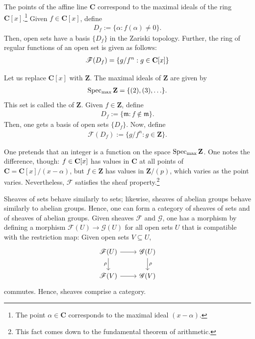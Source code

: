 \documentclass [11 pt, oneside, margin = 1 in] {article}
\begin{document}
\begin{example}[ ]\label{}\text{}
The points of the affine line $\mathbf{C}$ correspond to the maximal ideals of the ring $\mathbf{C}[x]$.\footnote{The point $\alpha\in \mathbf{C}$ corresponds to the maximal ideal $(x-\alpha)$.} Given $f\in \mathbf{C}[x]$, define
\begin{align*}
	D_f := \{\alpha : f(\alpha)\ne 0\}.
\end{align*}
Then, open sets have a basis $\{D_f\}$ in the Zariski topology. Further, the ring of regular functions of an open set is given as follows: 
\begin{align*}
	\mathscr{F}(D_f) = \{g/f^n: g\in \mathbf C[x]\}
\end{align*}

Let us replace $\mathbf{C}[x]$ with $\mathbf{Z}$. The maximal ideals of $\mathbf{Z}$ are given by
\begin{align*}
	\operatorname{Spec\textsubscript{max}}\mathbf{Z} = \{(2),  (3),\hdots\}.
\end{align*}
This set is called the  of $\mathbf{Z}$. Given $f\in \mathbf{Z}$, define 
\begin{align*}
	D_f := \{\mathfrak{m}: f\notin  \mathfrak{m}\}.
\end{align*}
Then, one gets a basis of open sets $\{D_f\}$. Now, define
\begin{align*}
	\mathscr{F}(D_f) := \{ g/f^n : g\in \mathbf{Z}\}.
\end{align*}

One pretends that an integer is a function on the space $\operatorname{Spec\textsubscript{max}} \mathbf{Z}$. One notes the difference, though: $f\in \mathbf C[x]$ has values in $\mathbf{C}$ at all points of $\mathbf{C} = \mathbf{C}[x]/(x-\alpha)$, but $f\in \mathbf{Z}$ has values in $\mathbf{Z}/(p)$, which varies as the point varies. Nevertheless, $\mathscr{F}$ satisfies the sheaf property.\footnote{This fact comes down to the fundamental theorem of arithmetic.}
\end{example}

Sheaves of sets behave similarly to sets; likewise, sheaves of abelian groups behave similarly to abelian groups. Hence, one can form a category of sheaves of sets and of sheaves of abelian groups. Given sheaves $\mathscr{F}$ and $\mathscr{G}$, one has a morphism by defining a morphism $\mathscr{F}(U) \longrightarrow \mathscr{G}(U)$ for all open sets $U$ that is compatible with the restriction map: Given open sets $V\subseteq U$,
\[
\begin{tikzcd}
	\mathscr{F}(U)\ar[d,"\rho", swap] \ar[r]&  \mathscr{G}(U)  \ar[d,"\rho"] \\
	\mathscr{F}(V) \ar[r]&  \mathscr{G}(V)
\end{tikzcd}
\]
commutes. Hence, sheaves comprise a category.
\end{document}
